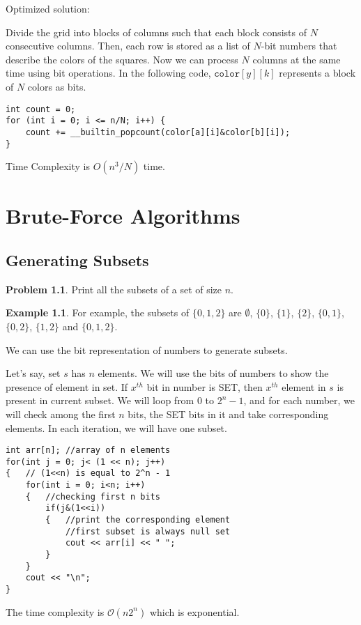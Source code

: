 \documentclass[twoside,12pt,a4paper,english]{book}
\theoremstyle{definition}
\newtheorem*{exmp}{Example}
\theoremstyle{problemstyle}
\newtheorem*{problem}{Problem} %
\theoremstyle{problemstyle}
\theoremstyle{problemstyle}
\begin{document}
\newpage
\begin{tcolorbox}[title=Solution]

Optimized solution:

Divide the grid into blocks
of columns such that each block consists of $N$
consecutive columns. Then, each row is stored as
a list of $N$-bit numbers that describe the colors
of the squares. Now we can process $N$ columns at the same time
using bit operations. In the following code,
$\texttt{color}[y][k]$ represents
a block of $N$ colors as bits.
\begin{lstlisting}
int count = 0;
for (int i = 0; i <= n/N; i++) {
    count += __builtin_popcount(color[a][i]&color[b][i]);
}
\end{lstlisting}
Time Complexity is $O(n^3/N)$ time.
\end{tcolorbox}

\chapter{Brute-Force Algorithms}


\section{Generating Subsets}

\begin{problem}
Print all the subsets of a set of size $n$.
\end{problem}

\begin{exmp}
For example, the subsets of $\{0,1,2\}$ are
$\emptyset$, $\{0\}$, $\{1\}$, $\{2\}$, $\{0,1\}$,
$\{0,2\}$, $\{1,2\}$ and $\{0,1,2\}$.
\end{exmp}

\begin{tcolorbox}[title=Solution]

We can use the bit representation of numbers to generate subsets.

Let's say, set $s$ has $n$ elements. We will use the bits of numbers to show the presence of element in set. If $x^{th}$ bit in number is SET, then $x^{th}$ element in $s$ is present in current subset. We will loop from $0$ to $2^n - 1$, and for each number, we will check among the first $n$ bits, the SET bits in it and take corresponding elements. In each iteration, we will have one subset.

\begin{lstlisting}
int arr[n]; //array of n elements
for(int j = 0; j< (1 << n); j++)
{   // (1<<n) is equal to 2^n - 1
    for(int i = 0; i<n; i++)
    {   //checking first n bits
        if(j&(1<<i))
        {   //print the corresponding element
            //first subset is always null set
            cout << arr[i] << " ";
        }
    }
    cout << "\n";
}
\end{lstlisting}
The time complexity is $\mathcal{O}(n2^n)$ which is exponential.
\end{tcolorbox}
\end{document}
